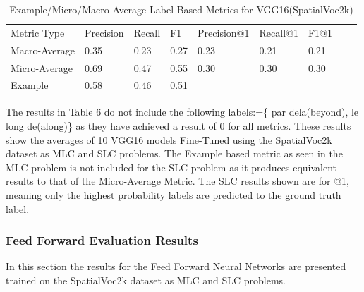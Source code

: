 \documentclass{csfyp}
\begin{document}
\begin{table}[!htbp]
\begin{tabular}{|l|l|l|l|l|l|l|l|l}
Metric Type  & Precision &  Recall & F1 & Precision@1 & Recall@1 & F1@1 \\ \cline{1-7}
Macro-Average &	0.35	&	0.23	&	0.27	&	0.23	&	0.21	&	0.21 \\ \cline{1-7}
Micro-Average &	0.69	&	0.47	&	0.55	&	0.30	&	0.30	&	0.30 \\ \cline{1-7}
Example      &	0.58	&	0.46	&	0.51  \\ \cline{1-4}
\end{tabular}
\caption{Example/Micro/Macro Average Label Based Metrics for VGG16(SpatialVoc2k)}
The results in Table 6 do not include the following labels:=\{ par dela(beyond), le long de(along)\} as they have achieved a result of 0 for all metrics. These results show the averages of 10 VGG16 models Fine-Tuned using the SpatialVoc2k dataset as MLC and SLC problems. The Example based metric as seen in the MLC problem is not included for the SLC problem as it produces equivalent results to that of the Micro-Average Metric. The SLC results shown are for @1, meaning only the highest probability labels are predicted to the ground truth label.
\vspace{-4mm}
\end{table}

\subsubsection{Feed Forward Evaluation Results}
In this section the results for the Feed Forward Neural Networks are presented trained on the SpatialVoc2k dataset as MLC and SLC problems.
\end{document}
